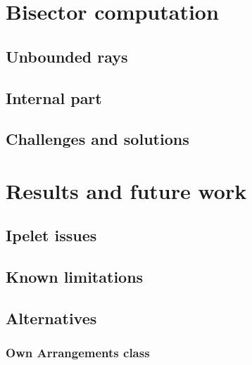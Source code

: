 \documentclass[11pt,a4paper,english]{article}
\begin{document}
	\section{Bisector computation}
	
	\subsection{Unbounded rays}
	
	\subsection{Internal part}
	
	\subsection{Challenges and solutions}
	
	
	\section{Results and future work}
	
	\subsection{Ipelet issues}
	
	\subsection{Known limitations}
	
	\subsection{Alternatives}
	
	\subsubsection{}
	
	\subsubsection{Own Arrangements class}
	
\end{document}
